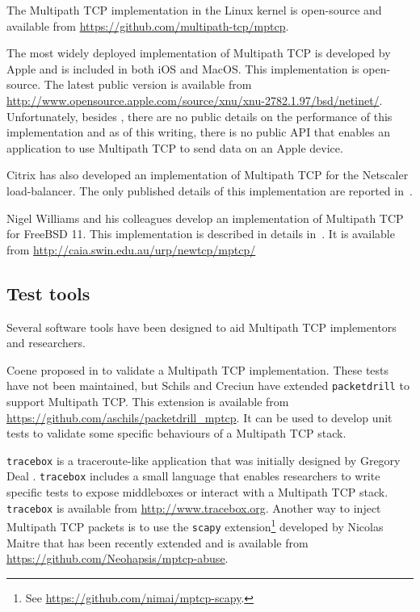 The Multipath TCP implementation in the Linux kernel is open-source and available from \url{https://github.com/multipath-tcp/mptcp}.

The most widely deployed implementation of Multipath TCP is developed by Apple and is included in both iOS and MacOS. This implementation is open-source. The latest public version is available from \url{http://www.opensource.apple.com/source/xnu/xnu-2782.1.97/bsd/netinet/}. Unfortunately, besides \cite{draft-eardley-mptcp-implementations-survey}, there are no public details on the performance of this implementation and as of this writing, there is no public API that enables an application to use Multipath TCP to send data on an Apple device.

Citrix has also developed an implementation of Multipath TCP for the Netscaler load-balancer. The only published details of this implementation are reported in~\cite{draft-eardley-mptcp-implementations-survey}.

Nigel Williams and his colleagues develop an implementation of Multipath TCP for FreeBSD 11. This implementation is described in details in~\cite{Williams_Design:2014}. It is available from \url{http://caia.swin.edu.au/urp/newtcp/mptcp/}

\subsection{Test tools}

Several software tools have been designed to aid Multipath TCP implementors and researchers. 

Coene proposed in \cite{draft-coene-mptcp-conformance} to validate a Multipath TCP implementation. These tests have not been maintained, but Schils and Creciun have extended \texttt{packetdrill} \cite{Cardwell_packetdrill:2013} to support Multipath TCP. This extension is available from \url{https://github.com/aschils/packetdrill_mptcp}. It can be used to develop unit tests to validate some specific behaviours of a Multipath TCP stack.

\texttt{tracebox} is a traceroute-like application that was initially designed by Gregory Deal \cite{Detal_tracebox:2013}. \texttt{tracebox} includes a small language that enables researchers to write specific tests to expose middleboxes or interact with a Multipath TCP stack. \texttt{tracebox} is available from \url{http://www.tracebox.org}. Another way to inject Multipath TCP packets is to use the \texttt{scapy} extension\footnote{See \url{https://github.com/nimai/mptcp-scapy}.} developed by Nicolas Maitre that has been recently extended and is available from \url{https://github.com/Neohapsis/mptcp-abuse}.



